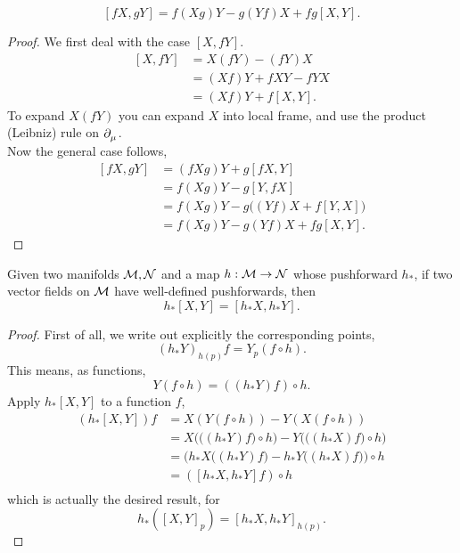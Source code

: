 \documentclass[../main.tex]{subfiles}
\begin{document}
    \begin{theorem}
    \label{thm:Functional-Product-Rule}
        \[
            [fX, gY] = f(Xg)Y - g(Yf)X + fg[X, Y].
        \]
    \end{theorem}
    \begin{proof}
        We first deal with the case \([X, fY]\).
        \[
        \begin{aligned}
            [X, fY] &= X(fY) - (fY)X \\
            &= (Xf)Y + fXY - fYX \\
            &= (Xf)Y + f[X, Y].
        \end{aligned}
        \]
        To expand \(X(fY)\) you can expand \(X\) into local frame, and
        use the product (Leibniz) rule on \(\tfld{\mu}\).\\
        Now the general case follows,
        \[
        \begin{aligned}
            [fX, gY] &= (fXg)Y + g[fX, Y] \\
                     &= f(Xg)Y - g[Y, fX] \\
                     &= f(Xg)Y - g\big((Yf)X+f[Y, X]\big) \\
                     &= f(Xg)Y - g(Yf)X + fg[X, Y].
        \end{aligned}
        \]
    \end{proof}
    \begin{theorem}
    \label{thm:Pushforward-and-Lie-Bracket}
    Given two manifolds \(\manifold[M], \manifold[N]\) and a map \(h :
    \manifold[M] \to \manifold[N]\) whose pushforward \(h_*\), if two vector
    fields on \(\manifold[M]\) have well-defined pushforwards, then
        \[
        h_*[X, Y] = [h_*X, h_*Y].
        \]
    \end{theorem}
    \begin{proof}
        First of all, we write out explicitly the corresponding points,
        \[
            \left( h_*Y \right) _{h(p)}f = Y_p\left( f\circ h \right).
        \]
        This means, as functions, 
        \[
        Y(f\circ h) = \left( (h_*Y)f \right) \circ h.
        \]
        Apply \(h_*[X, Y]\) to a function \(f\),
        \[
        \begin{aligned}
            \left( h_*[X, Y] \right) f &= X(Y(f\circ h)) - Y(X(f\circ h)) \\
            &= X\Big(\big((h_*Y)f\big)\circ h\Big) -
            Y\Big(\big((h_*X)f\big)\circ h\Big) \\
            &= \Big( h_*X \big((h_*Y)f\big) - h_*Y\big((h_*X)f\big) \Big) \circ h \\
            &= \left( [h_*X, h_*Y]f \right) \circ h \\
        \end{aligned}
        \]
        which is actually the desired result, for
        \[
            h_*([X, Y]_p) = [h_*X, h_*Y]_{h(p)}.
        \]
    \end{proof}
\end{document}
